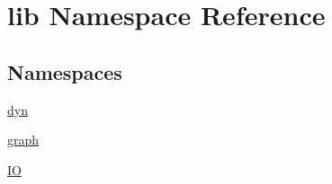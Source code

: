 \hypertarget{a00102}{\section{lib Namespace Reference}
\label{a00102}
}
\subsection*{Namespaces}
\begin{DoxyCompactItemize}
\item 
\hyperlink{a00103}{dyn}
\item 
\hyperlink{a00105}{graph}
\item 
\hyperlink{a00108}{I\-O}
\end{DoxyCompactItemize}
